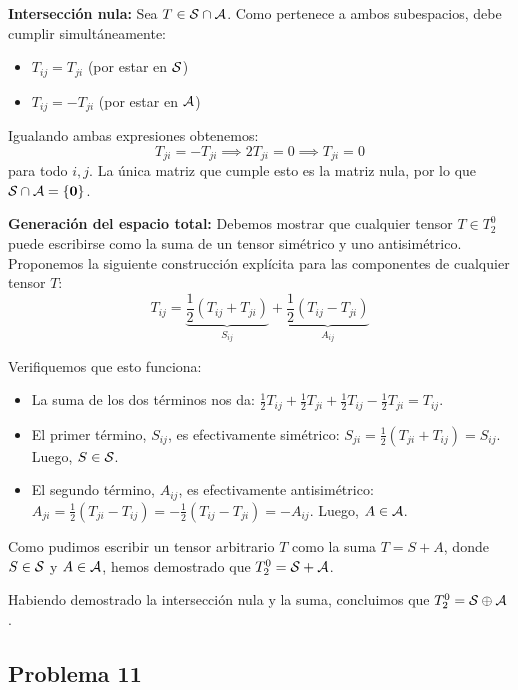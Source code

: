 \documentclass[11pt,spanish]{article}
\begin{document}
\begin{itemize}
{\bf Intersección nula:}
Sea $T \in \cal{S} \cap \cal{A}$. Como pertenece a ambos subespacios, debe cumplir simultáneamente:
\begin{itemize}
\item $T_{ij} = T_{ji}$ (por estar en $\cal{S}$)
\item  $T_{ij} = -T_{ji}$ (por estar en $\cal{A}$)
\end{itemize}

Igualando ambas expresiones obtenemos:
$$T_{ji} = -T_{ji} \implies 2T_{ji} = 0 \implies T_{ji} = 0$$ para todo $i,j$.
La única matriz que cumple esto es la matriz nula, por lo que $\cal{S} \cap \cal{A} = \{\mathbf{0}\}$.

{\bf Generación del espacio total:}
Debemos mostrar que cualquier tensor $T \in T_2^0$ puede escribirse como la suma de un tensor simétrico y uno antisimétrico.
Proponemos la siguiente construcción explícita para las componentes de cualquier tensor $T$:
$$T_{ij} = \underbrace{\frac{1}{2}(T_{ij} + T_{ji})}_{S_{ij}} + \underbrace{\frac{1}{2}(T_{ij} - T_{ji})}_{A_{ij}}$$

Verifiquemos que esto funciona:
\begin{itemize}
\item La suma de los dos términos nos da: $\frac{1}{2}T_{ij} + \frac{1}{2}T_{ji} + \frac{1}{2}T_{ij} - \frac{1}{2}T_{ji} = T_{ij}$.
\item El primer término, $S_{ij}$, es efectivamente simétrico: $S_{ji} = \frac{1}{2}(T_{ji} + T_{ij}) = S_{ij}$. Luego, $S \in \cal{S}$.
\item El segundo término, $A_{ij}$, es efectivamente antisimétrico: $A_{ji} = \frac{1}{2}(T_{ji} - T_{ij}) = -\frac{1}{2}(T_{ij} - T_{ji}) = -A_{ij}$. Luego, $A \in \cal{A}$.
\end{itemize}

Como pudimos escribir un tensor arbitrario $T$ como la suma $T = S + A$, donde $S \in \cal{S}$ y $A \in \cal{A}$, hemos demostrado que $T_2^0 = \cal{S} + \cal{A}$.

Habiendo demostrado la intersección nula y la suma, concluimos que $T_2^0 = \cal{S} \oplus \cal{A}$.
 
\end{itemize}

\subsection*{Problema 11}
\end{document}
